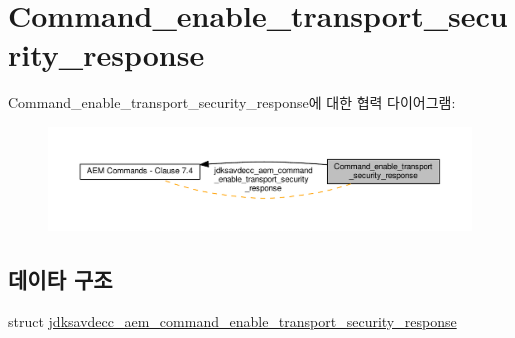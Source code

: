 \hypertarget{group__command__enable__transport__security__response}{}\section{Command\+\_\+enable\+\_\+transport\+\_\+security\+\_\+response}
\label{group__command__enable__transport__security__response}
Command\+\_\+enable\+\_\+transport\+\_\+security\+\_\+response에 대한 협력 다이어그램\+:
\nopagebreak
\begin{figure}[H]
\begin{center}
\leavevmode
\includegraphics[width=350pt]{group__command__enable__transport__security__response}
\end{center}
\end{figure}
\subsection*{데이타 구조}
\begin{DoxyCompactItemize}
\item 
struct \hyperlink{structjdksavdecc__aem__command__enable__transport__security__response}{jdksavdecc\+\_\+aem\+\_\+command\+\_\+enable\+\_\+transport\+\_\+security\+\_\+response}
\end{DoxyCompactItemize}
